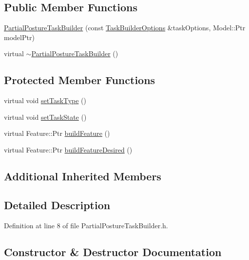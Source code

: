\subsection*{Public Member Functions}
\begin{DoxyCompactItemize}
\item 
\hyperlink{classocra_1_1PartialPostureTaskBuilder_a4c8585a8722241b52a02ccb73bb3a675}{Partial\+Posture\+Task\+Builder} (const \hyperlink{classocra_1_1TaskBuilderOptions}{Task\+Builder\+Options} \&task\+Options, Model\+::\+Ptr model\+Ptr)
\item 
virtual \hyperlink{classocra_1_1PartialPostureTaskBuilder_a59c3cec0e4480654c360af17dc195b5a}{$\sim$\+Partial\+Posture\+Task\+Builder} ()
\end{DoxyCompactItemize}
\subsection*{Protected Member Functions}
\begin{DoxyCompactItemize}
\item 
virtual void \hyperlink{classocra_1_1PartialPostureTaskBuilder_acf2b5f880dc19e43356552b348d8a010}{set\+Task\+Type} ()
\item 
virtual void \hyperlink{classocra_1_1PartialPostureTaskBuilder_a70b416b1666a772940d96338a317af0a}{set\+Task\+State} ()
\item 
virtual Feature\+::\+Ptr \hyperlink{classocra_1_1PartialPostureTaskBuilder_ab4a80855ccc820bbeabf4eed87487784}{build\+Feature} ()
\item 
virtual Feature\+::\+Ptr \hyperlink{classocra_1_1PartialPostureTaskBuilder_a1a853459b32e838d04205459c608f5b2}{build\+Feature\+Desired} ()
\end{DoxyCompactItemize}
\subsection*{Additional Inherited Members}


\subsection{Detailed Description}


Definition at line 8 of file Partial\+Posture\+Task\+Builder.\+h.



\subsection{Constructor \& Destructor Documentation}
